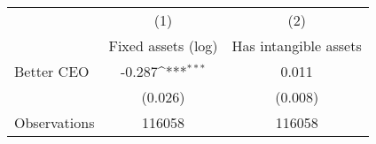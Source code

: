 {
\def\sym#1{\ifmmode^{#1}\else\(^{#1}\)\fi}
\begin{tabular}{l*{2}{c}}
\hline\hline
                    &\multicolumn{1}{c}{(1)}&\multicolumn{1}{c}{(2)}\\
                    &\multicolumn{1}{c}{Fixed assets (log)}&\multicolumn{1}{c}{Has intangible assets}\\
\hline
Better CEO          &      -0.287\sym{***}&       0.011         \\
                    &     (0.026)         &     (0.008)         \\
\hline
Observations        &      116058         &      116058         \\
\hline\hline
\end{tabular}
}
